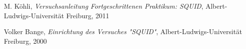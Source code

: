 \documentclass[12pt]{article}
\begin{document}
\newpage
\listoffigures


\newpage
\thispagestyle{empty}
\begin{thebibliography}{9}

  

  
  

M. Köhli,
\emph{Versuchsanleitung Fortgeschrittenen Praktikum: SQUID},
Albert-Ludwigs-Universität Freiburg,
2011

Volker Bange,
\emph{Einrichtung des Versuches "SQUID"},
Albert-Ludwigs-Universität Freiburg,
2000
\end{thebibliography}
\end{document}
